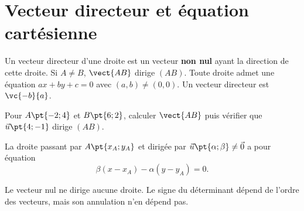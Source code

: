 \section{Vecteur directeur et équation cartésienne}
\begin{keypoint}[Définition]
Un vecteur directeur d'une droite est un vecteur \textbf{non nul} ayant la direction de cette droite. Si $A\ne B$, $\vect{AB}$ dirige $(AB)$.
Toute droite admet une équation $ax+by+c=0$ avec $(a,b)\ne(0,0)$. Un vecteur directeur est $\vc{-b}{a}$.
\end{keypoint}
\begin{example}Pour $A\pt{-2;4}$ et $B\pt{6;2}$, calculer $\vect{AB}$ puis vérifier que $\vec u\pt{4;-1}$ dirige $(AB)$.\end{example}
\begin{keypoint}
La droite passant par $A\pt{x_A;y_A}$ et dirigée par $\vec u\pt{\alpha;\beta}\ne\vec0$ a pour équation
\[\beta(x-x_A)-\alpha(y-y_A)=0.\]
\end{keypoint}
\begin{pitfall}Le vecteur nul ne dirige aucune droite. Le signe du déterminant dépend de l'ordre des vecteurs, mais son annulation n'en dépend pas.\end{pitfall}

